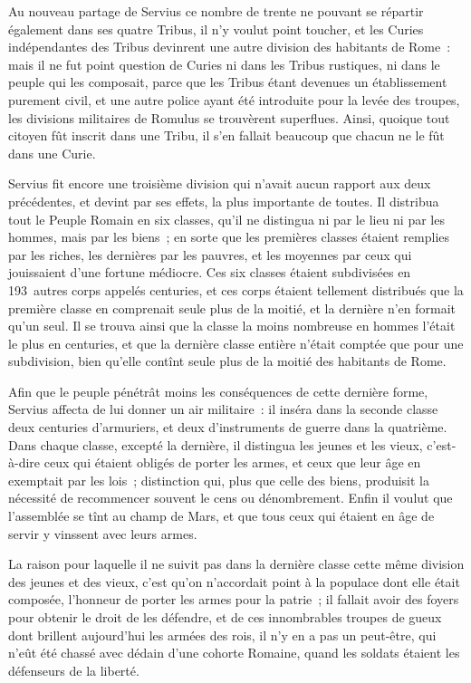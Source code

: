 \documentclass[french,twoside]{book} %
\begin{document}
Au nouveau partage de Servius ce nombre de trente ne pouvant se répartir également dans ses quatre Tribus, il n’y voulut point toucher, et les Curies indépendantes des Tribus devinrent une autre division des habitants de Rome : mais il ne fut point question de Curies ni dans les Tribus rustiques, ni dans le peuple qui les composait, parce que les Tribus étant devenues un établissement purement civil, et une autre police ayant été introduite pour la levée des troupes, les divisions militaires de Romulus se trouvèrent superflues. Ainsi, quoique tout citoyen fût inscrit dans une Tribu, il s’en fallait beaucoup que chacun ne le fût dans une Curie.\par
Servius fit encore une troisième division qui n’avait aucun rapport aux deux précédentes, et devint par ses effets, la plus importante de toutes. Il distribua tout le Peuple Romain en six classes, qu’il ne distingua ni par le lieu ni par les hommes, mais par les biens ; en sorte que les premières classes étaient remplies par les riches, les dernières par les pauvres, et les moyennes par ceux qui jouissaient d’une fortune médiocre. Ces six classes étaient subdivisées en 193 autres corps appelés centuries, et ces corps étaient tellement distribués que la première classe en comprenait seule plus de la moitié, et la dernière n’en formait qu’un seul. Il se trouva ainsi que la classe la moins nombreuse en hommes l’était le plus en centuries, et que la dernière classe entière n’était comptée que pour une subdivision, bien qu’elle contînt seule plus de la moitié des habitants de Rome.\par
Afin que le peuple pénétrât moins les conséquences de cette dernière forme, Servius affecta de lui donner un air militaire : il inséra dans la seconde classe deux centuries d’armuriers, et deux d’instruments de guerre dans la quatrième. Dans chaque classe, excepté la dernière, il distingua les jeunes et les vieux, c’est-à-dire ceux qui étaient obligés de porter les armes, et ceux que leur âge en exemptait par les lois ; distinction qui, plus que celle des biens, produisit la nécessité de recommencer souvent le cens ou dénombrement. Enfin il voulut que l’assemblée se tînt au champ de Mars, et que tous ceux qui étaient en âge de servir y vinssent avec leurs armes.\par
La raison pour laquelle il ne suivit pas dans la dernière classe cette même division des jeunes et des vieux, c’est qu’on n’accordait point à la populace dont elle était composée, l’honneur de porter les armes pour la patrie ; il fallait avoir des foyers pour obtenir le droit de les défendre, et de ces innombrables troupes de gueux dont brillent aujourd’hui les armées des rois, il n’y en a pas un peut-être, qui n’eût été chassé avec dédain d’une cohorte Romaine, quand les soldats étaient les défenseurs de la liberté.\par
\end{document}
